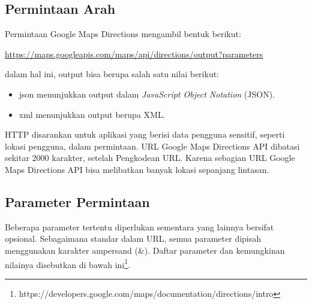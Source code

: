 \subsection{Permintaan Arah}
\label{subsec:permintaanarahgoogledir}

Permintaan Google Maps Directions mengambil bentuk berikut:

\url{https://maps.googleapis.com/maps/api/directions/output?parameters}

dalam hal ini, output bisa berupa salah satu nilai berikut: 
\begin{itemize}
	\item json menunjukkan output dalam \textit{JavaScript Object Notation} (JSON).
	\item xml menunjukkan output berupa XML.
\end{itemize} 

HTTP disarankan untuk aplikasi yang berisi data pengguna sensitif, seperti lokasi pengguna, dalam permintaan. URL Google Maps Directions API dibatasi sekitar 2000 karakter, setelah Pengkodean URL. Karena sebagian URL Google Maps Directions API bisa melibatkan banyak lokasi sepanjang lintasan.

\subsection{Parameter Permintaan}
\label{subsec:parameterpermintaangoogledir}

Beberapa parameter tertentu diperlukan sementara yang lainnya bersifat opsional. Sebagaimana standar dalam URL, semua parameter dipisah menggunakan karakter ampersand (\&). Daftar parameter dan kemungkinan nilainya disebutkan di bawah ini\footnote{https://developers.google.com/maps/documentation/directions/intro}.

